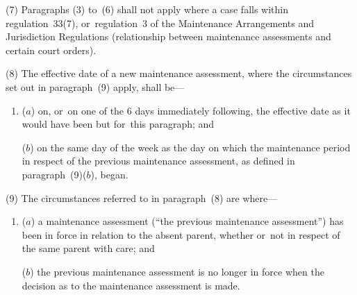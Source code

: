 \documentclass[a4paper,12pt]{article}
\begin{document}
(7) Paragraphs (3) to~(6) shall not apply where a case falls within regulation~33(7), or~regulation~3 of the Maintenance Arrangements and Jurisdiction Regulations (relationship between maintenance assessments and certain court orders).

(8) The effective date of a new maintenance assessment, where the circumstances set out in paragraph~(9) apply, shall be—
\begin{enumerate}\item[]
($a$) on, or~on one of the 6 days immediately following, the effective date as it would have been but for~this paragraph; and

($b$) on the same day of the week as the day on which the maintenance period in respect of the previous maintenance assessment, as defined in paragraph~(9)($b$), began.
\end{enumerate}

(9) The circumstances referred to in paragraph~(8) are where—
\begin{enumerate}\item[]
($a$) a maintenance assessment (“the previous maintenance assessment”) has been in force in relation to the absent parent, whether or~not in respect of the same parent with care; and

($b$) the previous maintenance assessment is no longer in force when the decision as to the maintenance assessment is made.
\end{enumerate}
\end{document}
